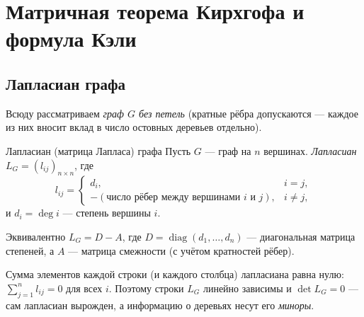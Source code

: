 
\section{Матричная теорема Кирхгофа и формула Кэли}

\subsection{Лапласиан графа}

Всюду рассматриваем \emph{граф $G$ без петель} (кратные рёбра допускаются — каждое из них вносит вклад в число остовных деревьев отдельно).

\begin{Definition}{Лапласиан (матрица Лапласа) графа}{}
	Пусть $G$ — граф на $n$ вершинах. \emph{Лапласиан} $L_G = (l_{ij})_{n\times n}$, где
	\[
	l_{ij} =
	\begin{cases}
		d_i, & i = j,\\
		-(\text{число рёбер между вершинами } i \text{ и } j), & i \neq j,
	\end{cases}
	\]
	и $d_i = \deg i$ — степень вершины $i$.
\end{Definition}

\begin{Remark}{}{}
	Эквивалентно $L_G = D - A$, где $D=\operatorname{diag}(d_1,\dots,d_n)$ — диагональная матрица степеней, а $A$ — матрица смежности (с учётом кратностей рёбер).
\end{Remark}

\begin{Remark}{}{}
	Сумма элементов каждой строки (и каждого столбца) лапласиана равна нулю:
	$\displaystyle\sum_{j=1}^{n} l_{ij} = 0$ для всех $i$. Поэтому строки $L_G$ линейно зависимы и $\det L_G = 0$ — сам лапласиан вырожден, а информацию о деревьях несут его \emph{миноры}.
\end{Remark}

